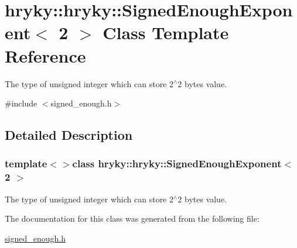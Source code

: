 \hypertarget{classhryky_1_1hryky_1_1_signed_enough_exponent_3_012_01_4}{\section{hryky\-:\-:hryky\-:\-:Signed\-Enough\-Exponent$<$ 2 $>$ Class Template Reference}
\label{classhryky_1_1hryky_1_1_signed_enough_exponent_3_012_01_4}
}


The type of unsigned integer which can store 2$^\wedge$2 bytes value.  




{\ttfamily \#include $<$signed\-\_\-enough.\-h$>$}



\subsection{Detailed Description}
\subsubsection*{template$<$$>$class hryky\-::hryky\-::\-Signed\-Enough\-Exponent$<$ 2 $>$}

The type of unsigned integer which can store 2$^\wedge$2 bytes value. 

The documentation for this class was generated from the following file\-:\begin{DoxyCompactItemize}
\item 
\hyperlink{signed__enough_8h}{signed\-\_\-enough.\-h}\end{DoxyCompactItemize}
